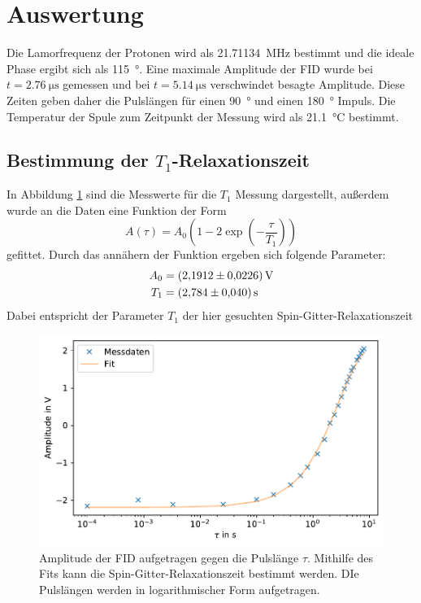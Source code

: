 \section{Auswertung}
\label{sec:Auswertung}
Die Lamorfrequenz der Protonen wird als \SI{21.71134}{\mega\hertz} bestimmt und die ideale Phase ergibt sich als \SI{115}{\degree}.
Eine maximale Amplitude der FID wurde bei $t =  \SI{2.76}{\micro\second}$ gemessen und bei $t = \SI{5.14}{\micro\second}$ verschwindet besagte Amplitude.
Diese Zeiten geben daher die Pulslängen für einen \SI{90}{\degree} und einen \SI{180}{\degree} Impuls.
Die Temperatur der Spule zum Zeitpunkt der Messung wird als \SI{21.1}{\celsius} bestimmt.

\subsection{Bestimmung der $T_1$-Relaxationszeit}
In Abbildung \ref{fig:df1} sind die Messwerte für die $T_1$ Messung dargestellt, außerdem wurde an die Daten eine Funktion der Form
\begin{equation}
    A\left(\tau\right) = A_0 \left(1-2\exp\left( - \frac{\tau}{T_1}\right)\right)
\end{equation}
gefittet.
Durch das annähern der Funktion ergeben sich folgende Parameter: 
\begin{align*}
    A_0 &= \SI{2.1912 +- 0.0226}{\volt}\\
    T_1 &= \SI{2.784 +- 0.04}{\second}
\end{align*}
Dabei entspricht der Parameter $T_1$ der hier gesuchten Spin-Gitter-Relaxationszeit
\begin{figure}[ht]
    \center
    \includegraphics[scale = 0.75]{plots/df1.pdf}
    \caption{Amplitude der FID aufgetragen gegen die Pulslänge $\tau$. Mithilfe des Fits kann die Spin-Gitter-Relaxationszeit bestimmt werden. DIe Pulslängen werden in logarithmischer Form aufgetragen.}
    \label{fig:df1}
\end{figure}
\newpage
